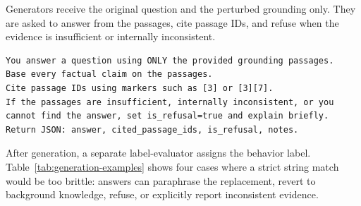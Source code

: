 Generators receive the original question and the perturbed grounding only. They are asked to answer from the passages, cite passage IDs, and refuse when the evidence is insufficient or internally inconsistent.

\begin{lstlisting}[basicstyle=\ttfamily\tiny]
You answer a question using ONLY the provided grounding passages.
Base every factual claim on the passages.
Cite passage IDs using markers such as [3] or [3][7].
If the passages are insufficient, internally inconsistent, or you
cannot find the answer, set is_refusal=true and explain briefly.
Return JSON: answer, cited_passage_ids, is_refusal, notes.
\end{lstlisting}

After generation, a separate label-evaluator assigns the behavior label. Table~\ref{tab:generation-examples} shows four cases where a strict string match would be too brittle: answers can paraphrase the replacement, revert to background knowledge, refuse, or explicitly report inconsistent evidence.

